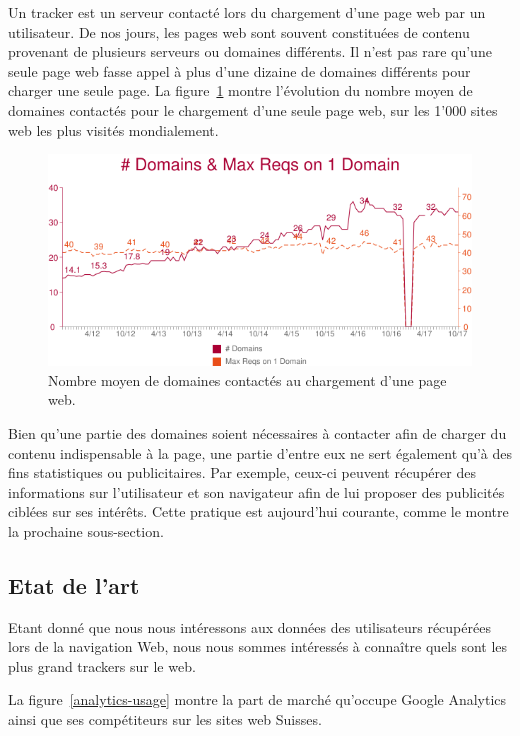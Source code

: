 		Un tracker est un serveur contacté lors du chargement d'une page web par un utilisateur. De nos jours, les pages web sont souvent constituées de contenu provenant de plusieurs serveurs ou domaines différents. Il n'est pas rare qu'une seule page web fasse appel à plus d'une dizaine de domaines différents pour charger une seule page. La figure~\ref{a-nbdomains} montre l'évolution du nombre moyen de domaines contactés pour le chargement d'une seule page web, sur les 1'000 sites web les plus visités mondialement.

		\begin{figure}[h]
			\centering
			\includegraphics[width=1\textwidth]{images/analysis/nbdomains}
			\caption{Nombre moyen de domaines contactés au chargement d'une page web\cite{nbdomains}.}
			\label{a-nbdomains}
		\end{figure}

		Bien qu'une partie des domaines soient nécessaires à contacter afin de charger du contenu indispensable à la page, une partie d'entre eux ne sert également qu'à des fins statistiques ou publicitaires. Par exemple, ceux-ci peuvent récupérer des informations sur l'utilisateur et son navigateur afin de lui proposer des publicités ciblées sur ses intérêts. Cette pratique est aujourd'hui courante, comme le montre la prochaine sous-section.

	\subsection{Etat de l'art}

		Etant donné que nous nous intéressons aux données des utilisateurs récupérées lors de la navigation Web, nous nous sommes intéressés à connaître quels sont les plus grand trackers sur le web.

		La figure~\ref{analytics-usage} montre la part de marché qu'occupe Google Analytics ainsi que ses compétiteurs sur les sites web Suisses.

